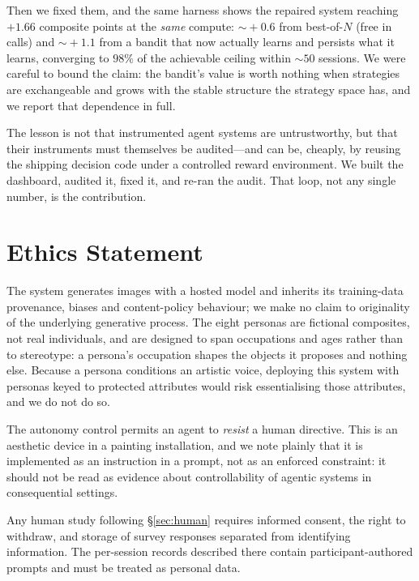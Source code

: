 \documentclass[11pt]{article}
\theoremstyle{plain}
\theoremstyle{definition}
\begin{document}
Then we fixed them, and the same harness shows the repaired system reaching
$+1.66$ composite points at the \emph{same} compute: $\sim\!+0.6$ from best-of-$N$
(free in calls) and $\sim\!+1.1$ from a bandit that now actually learns and
persists what it learns, converging to $98\%$ of the achievable ceiling within
$\sim\!50$ sessions. We were careful to bound the claim: the bandit's value is
worth nothing when strategies are exchangeable and grows with the stable
structure the strategy space has, and we report that dependence in full.

The lesson is not that instrumented agent systems are untrustworthy, but that
their instruments must themselves be audited---and can be, cheaply, by reusing
the shipping decision code under a controlled reward environment. We built the
dashboard, audited it, fixed it, and re-ran the audit. That loop, not any single
number, is the contribution.

\section*{Ethics Statement}
The system generates images with a hosted model and inherits its training-data
provenance, biases and content-policy behaviour; we make no claim to originality
of the underlying generative process. The eight personas are fictional
composites, not real individuals, and are designed to span occupations and ages
rather than to stereotype: a persona's occupation shapes the objects it proposes
and nothing else. Because a persona conditions an artistic voice, deploying this
system with personas keyed to protected attributes would risk essentialising
those attributes, and we do not do so.

The autonomy control permits an agent to \emph{resist} a human directive. This is
an aesthetic device in a painting installation, and we note plainly that it is
implemented as an instruction in a prompt, not as an enforced constraint: it
should not be read as evidence about controllability of agentic systems in
consequential settings.

Any human study following \S\ref{sec:human} requires informed consent, the right
to withdraw, and storage of survey responses separated from identifying
information. The per-session records described there contain participant-authored
prompts and must be treated as personal data.
\end{document}
